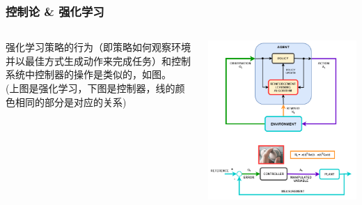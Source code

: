 \documentclass[12pt,AutoFakeBold,aspectratio=43,mathserif]{beamer}
\begin{document}
    \begin{frame}
        \frametitle{控制论 \& 强化学习}
        \begin{columns}
            \begin{column}{.4\linewidth}
                强化学习策略的行为（即策略如何观察环境并以最佳方式生成动作来完成任务）和控制系统中控制器的操作是类似的，如图。 \\
                (上图是强化学习，下图是控制器，线的颜色相同的部分是对应的关系)
            \end{column}
            \begin{column}{.5\linewidth}
                \includegraphics[width=.5\paperwidth]{figures/rl_for_control_systems.png}
            \end{column}
        \end{columns}
    \end{frame}
\end{document}
